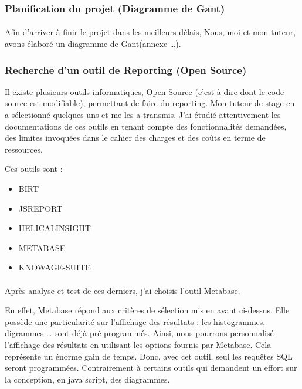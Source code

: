 \documentclass[a4paper,12pt]{report}
\begin{document}
\subsubsection{Planification du projet (Diagramme de Gant)}
\paragraph*{}
Afin d’arriver à finir le projet dans les meilleurs délais, Nous, moi et mon tuteur, avons élaboré un diagramme de Gant(annexe …).	  

\subsubsection{Recherche d’un outil de Reporting (Open Source)}

Il existe plusieurs outils  informatiques, Open Source (c’est-à-dire dont le code source est modifiable), permettant de faire du reporting. Mon tuteur de stage en a sélectionné  quelques uns et me les a transmis. J’ai étudié attentivement les documentations de ces outils  en tenant compte des fonctionnalités demandées, des limites invoquées dans le cahier des charges et des coûts en terme de ressources.\newline

Ces outils sont :
\newline
\begin{itemize}
 \item  BIRT
 \item JSREPORT
 \item HELICALINSIGHT
 \item METABASE
 \item KNOWAGE-SUITE
\end{itemize}

\paragraph*{}

               Après analyse et test de ces derniers, j’ai choisis l’outil Metabase.\newline
               
               En effet, Metabase répond aux  critères de sélection mis en avant ci-dessus. 
               Elle possède une particularité sur l’affichage des résultats : les histogrammes, digrammes … sont déjà pré-programmés. 
               Ainsi, nous pourrons personnalisé l’affichage des résultats en utilisant les options fournis par Metabase. Cela représente un énorme gain de temps.
               Donc, avec cet outil, seul les requêtes SQL seront programmées. Contrairement à certains outils qui demandent un effort sur la conception, en java script, des diagrammes.\newline    
               
\end{document}
